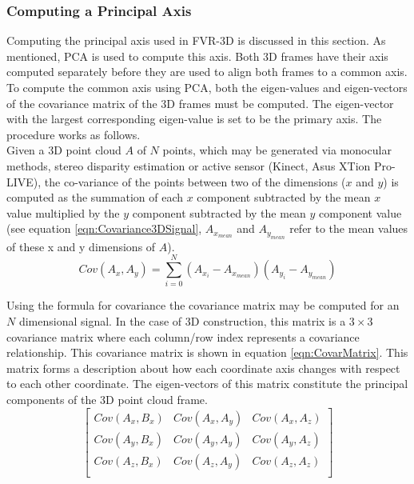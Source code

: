 \subsubsection{Computing a Principal Axis}

Computing the principal axis used in FVR-3D is discussed in this section. As mentioned, PCA is used to compute this axis. Both 3D frames have their axis computed separately before they are used to align both frames to a common axis. To compute the common axis using PCA, both the eigen-values and eigen-vectors of the covariance matrix of the 3D frames must be computed. The eigen-vector with the largest corresponding eigen-value is set to be the primary axis. The procedure works as follows. \\

Given a 3D point cloud $A$ of $N$ points, which may be generated via monocular methods, stereo disparity estimation or active sensor (Kinect, Asus XTion Pro-LIVE), the co-variance of the points between two of the dimensions ($x$ and $y$) is computed as the summation of each $x$ component subtracted by the mean $x$ value multiplied by the $y$ component subtracted by the mean $y$ component value (see equation \ref{eqn:Covariance3DSignal}, $A_{x_{mean}}$ and $A_{y_{mean}}$ refer to the mean values of these x and y dimensions of $A$). \\

\begin{equation} \label{eqn:Covariance3DSignal}
Cov(A_x,A_y) = \sum_{i=0}^{N}(A_{x_i} - A_{x_{mean}})(A_{y_i} - A_{y_{mean}})
\end{equation}

Using the formula for covariance the covariance matrix may be computed for an $N$ dimensional signal. In the case of 3D construction, this matrix is a $3 \times 3$ covariance matrix where each column/row index represents a covariance relationship. This covariance matrix is shown in equation \ref{eqn:CovarMatrix}. This matrix forms a description about how each coordinate axis changes with respect to each other coordinate. The eigen-vectors of this matrix constitute the principal components of the 3D point cloud frame. \\

\begin{equation} \label{eqn:CovarMatrix}
\left[
\begin{array}{ccc}
Cov(A_x, B_x) & Cov(A_x, A_y) & Cov(A_x, A_z) \\
Cov(A_y, B_x) & Cov(A_y, A_y) & Cov(A_y, A_z) \\
Cov(A_z, B_x) & Cov(A_z, A_y) & Cov(A_z, A_z) \\
\end{array}
\right]
\end{equation}

